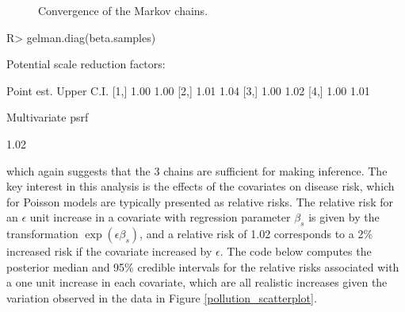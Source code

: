 \documentclass[article, nojss]{jss}
\begin{document}
\begin{figure}
\centering 
{}
\caption{Convergence of the Markov chains.\label{pollution_mcmc}}
\end{figure} 




\begin{CodeInput}
R>  gelman.diag(beta.samples)
\end{CodeInput}


\begin{CodeOutput}
Potential scale reduction factors:

     Point est. Upper C.I.
[1,]       1.00       1.00
[2,]       1.01       1.04
[3,]       1.00       1.02
[4,]       1.00       1.01

Multivariate psrf

1.02
\end{CodeOutput}

which again suggests that the 3 chains are sufficient for making inference. The key interest in this analysis is the effects of the covariates on disease risk, which for Poisson models are typically presented as relative risks. The relative risk for an $\epsilon$ unit increase in a covariate with regression parameter $\beta_s$ is given by the transformation $\exp(\epsilon\beta_s)$, and a relative risk of 1.02 corresponds to a 2\% increased risk if the covariate increased by $\epsilon$. The code below computes the posterior median and 95\% credible intervals  for the relative risks associated with a one unit increase in each covariate, which are all realistic increases given the variation observed in the data in Figure \ref{pollution_scatterplot}.
\end{document}
